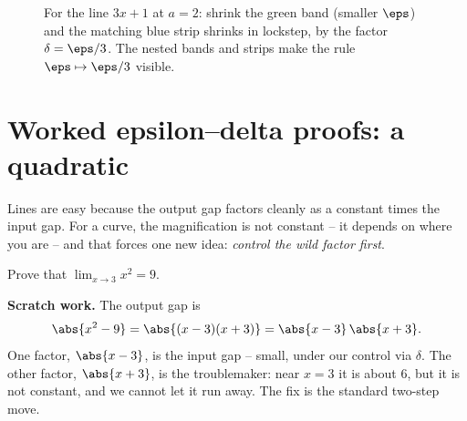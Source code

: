 \begin{figure}[H]
\centering
{}
\caption{For the line $3x+1$ at $a=2$: shrink the green band (smaller $\eps$) and
the matching blue strip shrinks in lockstep, by the factor $\delta=\eps/3$. The
nested bands and strips make the rule $\eps\mapsto\eps/3$ visible.}
\label{ch06:fig-linear}
\end{figure}

\section{Worked epsilon--delta proofs: a quadratic}
\label{ch06:quadratic}

Lines are easy because the output gap factors cleanly as a constant times the
input gap. For a curve, the magnification is not constant -- it depends on where
you are -- and that forces one new idea: \emph{control the wild factor first}.

\begin{example}
\label{ch06:ex-quad}
Prove that $\displaystyle \lim_{x\to 3} x^2 = 9$.
\end{example}

\textbf{Scratch work.} The output gap is
\[
  \abs{x^2 - 9} = \abs{(x-3)(x+3)} = \abs{x-3}\,\abs{x+3}.
\]
One factor, $\abs{x-3}$, is the input gap -- small, under our control via
$\delta$. The other factor, $\abs{x+3}$, is the troublemaker: near $x=3$ it is
about $6$, but it is not constant, and we cannot let it run away. The fix is the
standard two-step move.


